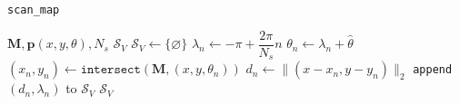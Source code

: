 \begin{algorithm}
  \caption{\texttt{scan\_map}}
  \begin{spacing}{1.3}
    \begin{algorithmic}[1]
      \REQUIRE $\bm{M}, \bm{p}(x, y, \theta), N_s$
      \ENSURE $\mathcal{S}_V$
      \STATE $\mathcal{S}_V \leftarrow \{\varnothing\}$
      \STATE $\lambda_n \leftarrow -\pi + \dfrac{2\pi}{N_s} n$
      \STATE $\theta_n \leftarrow \lambda_n + \hat{\theta}$
      \STATE $(x_n,y_n) \leftarrow \texttt{intersect}(\bm{M}, (x,y, \theta_n))$
      \STATE $d_n \leftarrow \|(x- x_n, y-y_n)\|_2$
      \STATE \texttt{append} $(d_n, \lambda_n)$ to $\mathcal{S}_V$
      \ENDFOR
      \RETURN $\mathcal{S}_V$
    \end{algorithmic}
  \end{spacing}
  \label{alg:scan_map}
\end{algorithm}
